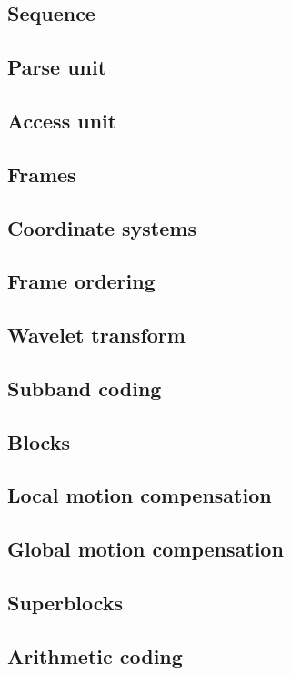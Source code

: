 


\subsection{Sequence}
\subsection{Parse unit}
\subsection{Access unit}
\subsection{Frames}
\subsection{Coordinate systems}
\subsection{Frame ordering}
\subsection{Wavelet transform}
\subsection{Subband coding}
\subsection{Blocks}
\subsection{Local motion compensation}
\subsection{Global motion compensation}
\subsection{Superblocks}
\subsection{Arithmetic coding}

